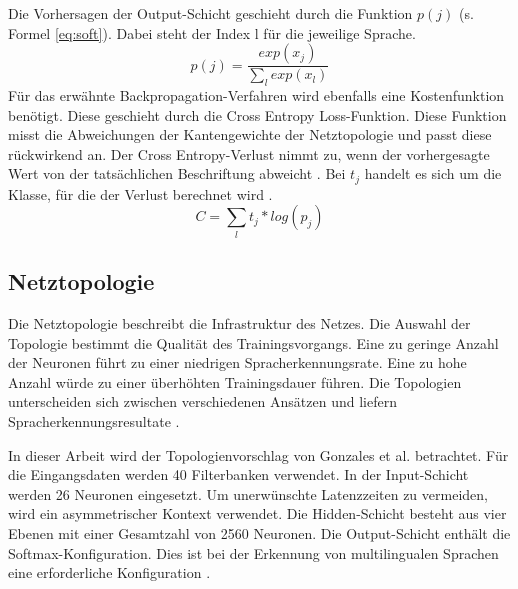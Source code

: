  Die Vorhersagen der Output-Schicht geschieht durch die Funktion $p(j)$  (s. Formel \ref{eq:soft}). Dabei steht der Index l für die jeweilige Sprache.
\begin{equation}
p(j)= \frac{ exp(x_{j}) }{\sum_{l}{}{ exp(x_{l})} }
\label{eq:soft}
\end{equation}
Für das erwähnte Backpropagation-Verfahren wird ebenfalls eine Kostenfunktion benötigt. Diese geschieht durch die Cross Entropy Loss-Funktion. Diese Funktion misst die Abweichungen der Kantengewichte der Netztopologie und passt diese rückwirkend an. Der Cross Entropy-Verlust nimmt zu, wenn der vorhergesagte Wert von der tatsächlichen Beschriftung abweicht \cite{MLCheatsheet.2017}. Bei $t_{j}$ handelt es sich um die Klasse, für die der Verlust berechnet wird \cite{GonzalezDominguez.2015}.
\begin{equation}
C= \sum_{l}{}{ t_{j} * log(p_{j})} 
\label{eq:back}
\end{equation}

\subsection{Netztopologie}
Die Netztopologie beschreibt die Infrastruktur des Netzes. Die Auswahl der Topologie bestimmt die Qualität des Trainingsvorgangs. Eine zu geringe Anzahl der Neuronen führt zu einer niedrigen Spracherkennungsrate. Eine zu hohe Anzahl würde zu einer überhöhten Trainingsdauer führen. Die Topologien unterscheiden sich zwischen verschiedenen Ansätzen und liefern Spracherkennungsresultate \cite{bishop.2006}. 

In dieser Arbeit wird der Topologienvorschlag von Gonzales et al. betrachtet. Für die Eingangsdaten werden 40 Filterbanken verwendet. In der Input-Schicht werden 26 Neuronen eingesetzt. Um unerwünschte Latenzzeiten zu vermeiden, wird ein asymmetrischer Kontext verwendet. Die Hidden-Schicht besteht aus vier Ebenen mit einer Gesamtzahl von 2560 Neuronen. Die Output-Schicht enthält die Softmax-Konfiguration. Dies ist bei der Erkennung von multilingualen Sprachen eine erforderliche Konfiguration \cite{GonzalezDominguez.2015}.
 

